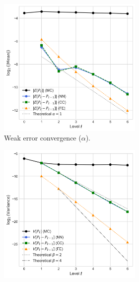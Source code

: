\begin{figure}[htbp]
    \centering
    \begin{subfigure}{\textwidth}
        \centering
        \begin{subfigure}[b]{0.48\textwidth}
            \centering
            \includegraphics[width=\linewidth]{graphics/she_energy_err_decay.png}
            \caption{Weak error convergence ($\alpha$).}
            \label{fig:energy_mean_decay}
        \end{subfigure}
        \hfill
        \begin{subfigure}[b]{0.48\textwidth}
            \centering
            \includegraphics[width=\linewidth]{graphics/she_energy_var_decay.png}

\end{subfigure}
\end{subfigure}
\end{figure}

